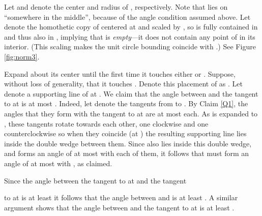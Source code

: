 \documentclass[letter,11pt]{article}
\begin{document}
Let  and  denote  the center and radius of , respectively.
Note that  lies on  ``somewhere in the middle'', because of
the angle condition assumed above.
Let  denote the homothetic copy of  centered at  and
scaled by , so  is fully contained in  and thus
also in , implying that  is {\em empty}---it
does not contain any point of  in its interior. (This scaling makes the
unit circle  bounding  coincide with .) See Figure \ref{fig:norm3}.



Expand  about its center  until the first time it 
touches either  or . Suppose, without loss of generality, 
that it touches . Denote this placement of  as .
Let  denote a supporting line of  at . We claim that the angle between  and the tangent  to  at  is at most . Indeed, let  denote the tangents from  to . By Claim \ref{Q1}, the angles that they form with the tangent  to  at  are at most  each. As  is expanded to , these tangents rotate towards each other, one clockwise and one counterclockwise so when they coincide (at ) the resulting supporting line  lies inside the double wedge between them. Since  also lies inside this double wedge, and forms an angle of at most  with each of them, it follows that  must form an angle of at most  with , as claimed.

Since the angle between the tangent  to  at  and the tangent

to  at  is at least  it follows that the angle between
 and  is at least . 
A similar argument shows that the angle between  and 
the tangent  to  at  is at least  . 
 
\end{document}
